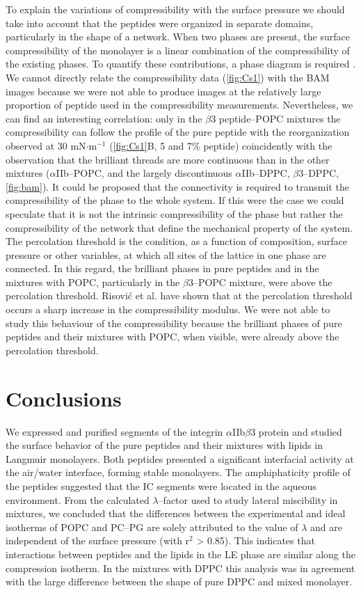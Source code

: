 \documentclass[journal=jacsat,manuscript=article]{achemso}
\begin{document}
To explain the variations of compressibility with the surface pressure we should take into account that the peptides were organized in separate domains, particularly in the shape of a network. When two phases are present, the surface compressibility of the monolayer is a linear combination of the compressibility of the existing phases. To quantify these contributions, a phase diagram is required \cite{2013_Caruso}. We cannot directly relate the compressibility data (\autoref{fig:Cs1}) with the BAM images because we were not able to produce images at the relatively large proportion of peptide used in the compressibility measurements. Nevertheless, we can find an interesting correlation: only in the $\beta$3 peptide–POPC mixtures the compressibility can follow the profile of the pure peptide with the reorganization observed at 30 mN$\cdot$m$^{-1}$ (\autoref{fig:Cs1}B, 5 and 7\% peptide) coincidently with the observation that the brilliant threads are more continuous than in the other mixtures ($\alpha$IIb–POPC, and the largely discontinuous $\alpha$IIb–DPPC, $\beta$3–DPPC, \autoref{fig:bam}). It could be proposed that the connectivity is required to transmit the compressibility of the phase to the whole system. If this were the case we could speculate that it is not the intrinsic compressibility of the phase but rather the compressibility of the network that define the mechanical property of the system.
The percolation threshold is the condition, as a function of composition, surface pressure or other variables, at which all sites of the lattice in one phase are connected. In this regard, the brilliant phases in pure peptides and in the mixtures with POPC, particularly in the $\beta$3–POPC mixture, were above the percolation threshold.  Risović  et al.\cite{2011_Risovic} have shown that at the percolation threshold occurs a sharp increase in the compressibility modulus. We were not able to study this behaviour of the compressibility because the brilliant phases of pure peptides and their mixtures with POPC, when visible, were already above the percolation threshold.

\section{Conclusions}
We expressed and purified segments of the integrin $\alpha$IIb$\beta$3 protein and studied the surface behavior of the pure peptides and their mixtures with lipids in Langmuir monolayers. Both peptides presented a significant interfacial activity at the air/water interface, forming stable monolayers. The amphiphaticity profile of the peptides suggested that the IC segments were located in the aqueous environment. From the calculated $\lambda$–factor used to study lateral miscibility in mixtures, we concluded that the differences between the experimental and ideal isotherms of POPC and PC–PG are solely attributed to the value of $\lambda$ and are independent of the surface pressure (with r$^2$ > 0.85). This indicates that interactions between peptides and the lipids in the LE phase are similar along the compression isotherm. In the mixtures with DPPC this analysis was in agreement with the large difference between the shape of pure DPPC and mixed monolayer.
\end{document}
